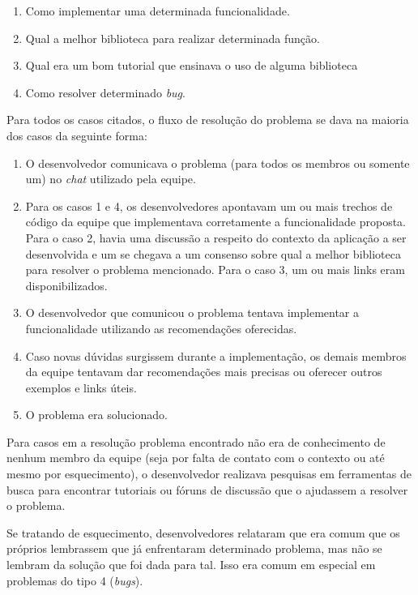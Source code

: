 
\begin{enumerate}
  \item Como implementar uma determinada funcionalidade.
  \item Qual a melhor biblioteca para realizar determinada função.
  \item Qual era um bom tutorial que ensinava o uso de alguma biblioteca
  \item Como resolver determinado \textit{bug}.
\end{enumerate}

Para todos os casos citados, o fluxo de resolução do problema se dava na maioria dos casos da seguinte forma:


\begin{enumerate}
  \item O desenvolvedor comunicava o problema (para todos os membros ou somente um) no \textit{chat} utilizado pela equipe.
  \item Para os casos 1 e 4, os desenvolvedores apontavam um ou mais trechos de código da equipe que implementava corretamente a funcionalidade proposta. Para o caso 2, havia uma discussão a respeito do contexto da aplicação a ser desenvolvida e um se chegava a um consenso sobre qual a melhor biblioteca para resolver o problema mencionado. Para o caso 3, um ou mais links eram disponibilizados.
  \item O desenvolvedor que comunicou o problema tentava implementar a funcionalidade utilizando as recomendações oferecidas.
  \item Caso novas dúvidas surgissem durante a implementação, os demais membros da equipe tentavam dar recomendações mais precisas ou oferecer outros exemplos e links úteis.
  \item O problema era solucionado.
\end{enumerate}

Para casos em a resolução problema encontrado não era de conhecimento de nenhum membro da equipe (seja por falta de contato com o contexto ou até mesmo por esquecimento), o desenvolvedor realizava pesquisas em ferramentas de busca para encontrar tutoriais ou fóruns de discussão que o ajudassem a resolver o problema.

Se tratando de esquecimento, desenvolvedores relataram que era comum que os próprios lembrassem que já enfrentaram determinado problema, mas não se lembram da solução que foi dada para tal. Isso era comum em especial em problemas do tipo 4 (\textit{bugs}).

